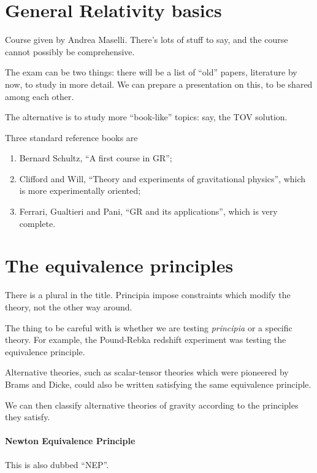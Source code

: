 \documentclass[main.tex]{subfiles}
\begin{document}
\section{General Relativity basics}


Course given by Andrea Maselli.
There's lots of stuff to say, and the course cannot possibly be comprehensive. 

The exam can be two things: there will be a list of ``old'' papers, literature by now, to study in more detail. 
We can prepare a presentation on this, to be shared among each other. 

The alternative is to study more ``book-like'' topics: say, the TOV solution. 

Three standard reference books are 
\begin{enumerate}
    \item Bernard Schultz, ``A first course in GR'';
    \item Clifford and Will, ``Theory and experiments of gravitational physics'', which is more experimentally oriented;
    \item Ferrari, Gualtieri and Pani, ``GR and its applications'', which is very complete. 
\end{enumerate}

\section{The equivalence principles}

There is a plural in the title. 
Principia impose constraints which modify the theory, not the other way around. 

The thing to be careful with is whether we are testing \emph{principia} or a specific theory. 
For example, the Pound-Rebka redshift experiment was testing the equivalence principle. 

Alternative theories, such as scalar-tensor theories which were pioneered by Brams and Dicke, could also be written satisfying the same equivalence principle. 

We can then classify alternative theories of gravity according to the principles they satisfy. 

\paragraph{Newton Equivalence Principle} This is also dubbed ``NEP''. 
\end{document}
